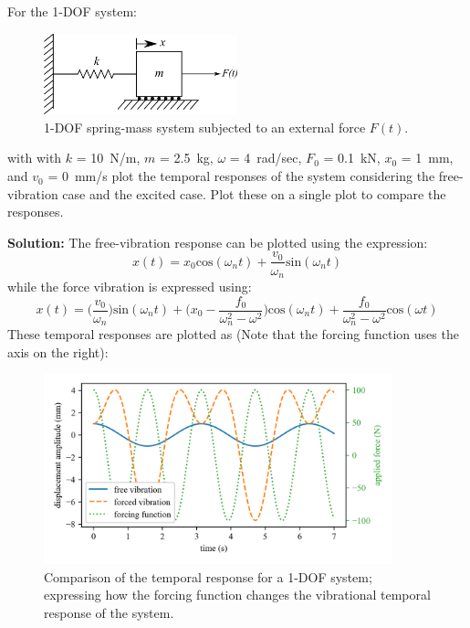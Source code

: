 \documentclass[12pt,letter]{article}
\begin{document}
	\begin{example}
		For the 1-DOF system:
		\begin{figure}[H]
			\centering
			\includegraphics[width=0.5\textwidth]{../figures/1-DOF-spring_mass_horizontal_forced.png}
			\caption{1-DOF spring-mass system subjected to an external force $F(t)$.}
		\end{figure}
		with with $k$ = 10~N/m, $m$ = 2.5~kg, $\omega$ = 4~rad/sec, $F_0$ = 0.1~kN, $x_0$ = 1~mm, and $v_0$ = 0~mm/s plot the temporal responses of the system considering the free-vibration case and the excited case. Plot these on a single plot to compare the responses. 
					
		\noindent\textbf{Solution:} The free-vibration response can be plotted using the expression:
		\begin{equation}
			x(t) = x_0\text{cos}(\omega_n t) + \frac{v_0}{\omega_n}\text{sin}(\omega_n t)
		\end{equation}				
		while the force vibration is expressed using:
		\begin{equation}
			x(t) = \Big(\frac{v_0}{\omega_n}\Big)\text{sin}(\omega_n t) + \Big(x_0-\frac{f_0}{\omega_n^2-\omega^2}\Big)\text{cos}(\omega_n t) + \frac{f_0}{\omega_n^2-\omega^2}\text{cos}(\omega t)
		\end{equation}	
		These temporal responses are plotted as (Note that the forcing function uses the axis on the right):
		\begin{figure}[H]
			\centering
			\includegraphics[width=0.9\textwidth]{../figures/free_and_forced_temporal_response.png}
			\caption{Comparison of the temporal response for a 1-DOF system; expressing how the forcing function changes the vibrational  temporal response of the system.}
		\end{figure}	
	\end{example}
	
\end{document}

